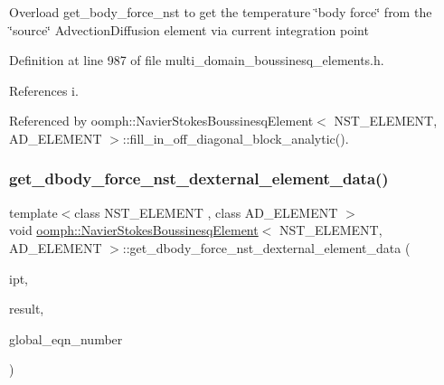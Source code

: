 Overload get\+\_\+body\+\_\+force\+\_\+nst to get the temperature \char`\"{}body force\char`\"{} from the \char`\"{}source\char`\"{} Advection\+Diffusion element via current integration point 

Definition at line 987 of file multi\+\_\+domain\+\_\+boussinesq\+\_\+elements.\+h.



References i.



Referenced by oomph\+::\+Navier\+Stokes\+Boussinesq\+Element$<$ N\+S\+T\+\_\+\+E\+L\+E\+M\+E\+N\+T, A\+D\+\_\+\+E\+L\+E\+M\+E\+N\+T $>$\+::fill\+\_\+in\+\_\+off\+\_\+diagonal\+\_\+block\+\_\+analytic().

\mbox{\label{classoomph_1_1NavierStokesBoussinesqElement_a8a84c39e2156ab16b7aefc400891ac27}} 
\subsubsection{\texorpdfstring{get\+\_\+dbody\+\_\+force\+\_\+nst\+\_\+dexternal\+\_\+element\+\_\+data()}{get\_dbody\_force\_nst\_dexternal\_element\_data()}}
{\footnotesize\ttfamily template$<$class N\+S\+T\+\_\+\+E\+L\+E\+M\+E\+NT , class A\+D\+\_\+\+E\+L\+E\+M\+E\+NT $>$ \\
void \hyperlink{classoomph_1_1NavierStokesBoussinesqElement}{oomph\+::\+Navier\+Stokes\+Boussinesq\+Element}$<$ N\+S\+T\+\_\+\+E\+L\+E\+M\+E\+NT, A\+D\+\_\+\+E\+L\+E\+M\+E\+NT $>$\+::get\+\_\+dbody\+\_\+force\+\_\+nst\+\_\+dexternal\+\_\+element\+\_\+data (\begin{DoxyParamCaption}\item[{const unsigned \&}]{ipt,  }\item[{\hyperlink{classoomph_1_1DenseMatrix}{Dense\+Matrix}$<$ double $>$ \&}]{result,  }\item[{\hyperlink{classoomph_1_1Vector}{Vector}$<$ unsigned $>$ \&}]{global\+\_\+eqn\+\_\+number }\end{DoxyParamCaption})}



